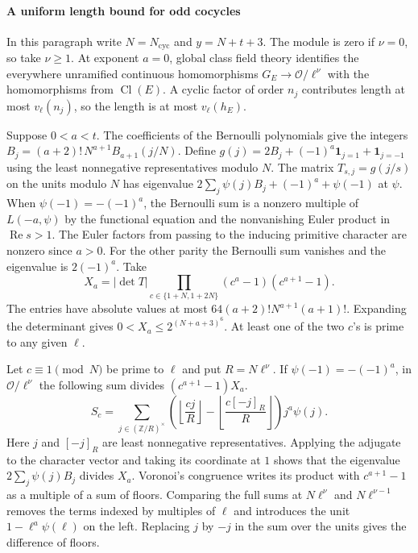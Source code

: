 \paragraph{A uniform length bound for odd cocycles}
In this paragraph write \(N=N_{\mathrm{cyc}}\) and \(y=N+t+3\). The module is zero if \(\nu=0\), so take \(\nu\ge1\). At exponent \(a=0\), global class field theory
identifies the everywhere unramified continuous homomorphisms \(G_E\to\mathcal O/\ell^\nu\)
with the homomorphisms from \(\operatorname{Cl}(E)\). A cyclic factor of order \(n_j\)
contributes length at most \(v_\ell(n_j)\), so the length is at most \(v_\ell(h_E)\).

Suppose \(0<a<t\). The coefficients of the Bernoulli polynomials give the integers
\(B_j=(a+2)!\,N^{a+1}B_{a+1}(j/N)\).
Define \(g(j)=2B_j+(-1)^a\mathbf 1_{j=1}+\mathbf 1_{j=-1}\) using the least nonnegative
representatives modulo \(N\). The matrix \(T_{s,j}=g(j/s)\) on the units modulo \(N\) has
eigenvalue \(2\sum_j\psi(j)B_j+(-1)^a+\psi(-1)\) at \(\psi\).
When \(\psi(-1)=-(-1)^a\), the Bernoulli sum is a nonzero multiple of \(L(-a,\psi)\)
by the functional equation and the nonvanishing Euler product in \(\operatorname{Re}s>1\).
The Euler factors from passing to the inducing primitive character are nonzero since \(a>0\).
For the other parity the Bernoulli sum vanishes and the eigenvalue is \(2(-1)^a\). Take
\[
 X_a=|\det T|\prod_{c\in\{1+N,1+2N\}}(c^a-1)(c^{a+1}-1).
\]
The entries have absolute values at most \(64(a+2)!N^{a+1}(a+1)!\).
Expanding the determinant gives \(0<X_a\le2^{(N+a+3)^6}\).
At least one of the two \(c\)'s is prime to any given \(\ell\).

Let \(c\equiv1\pmod N\) be prime to \(\ell\) and put \(R=N\ell^\nu\).
If \(\psi(-1)=-(-1)^a\), in \(\mathcal O/\ell^\nu\) the following sum divides
\((c^{a+1}-1)X_a\).
\[
 S_c=\sum_{j\in(\mathbb Z/R)^\times}
 \left(\left\lfloor\frac{cj}{R}\right\rfloor
       -\left\lfloor\frac{c[-j]_R}{R}\right\rfloor\right)j^a\psi(j).
\]
Here \(j\) and \([-j]_R\) are least nonnegative representatives.
Applying the adjugate to the character vector and taking its coordinate at \(1\) shows
that the eigenvalue \(2\sum_j\psi(j)B_j\) divides \(X_a\).
Voronoi's congruence writes its product with \(c^{a+1}-1\) as a multiple of a sum of floors.
Comparing the full sums at \(N\ell^\nu\) and \(N\ell^{\nu-1}\) removes the terms indexed
by multiples of \(\ell\) and introduces the unit \(1-\ell^a\psi(\ell)\) on the left.
Replacing \(j\) by \(-j\) in the sum over the units gives the difference of floors.

